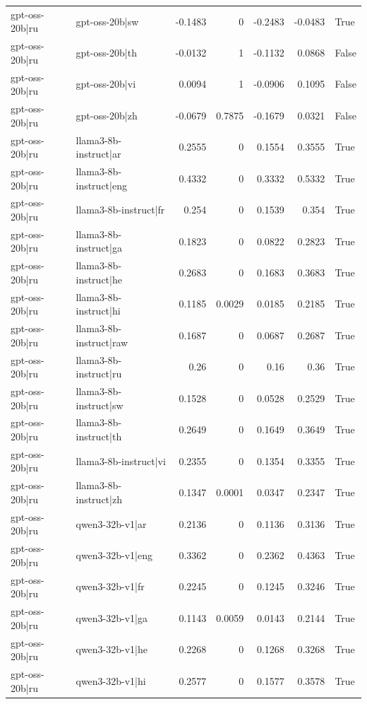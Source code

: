 \begin{table}
\begin{tabular}{l l r r r r l}
gpt-oss-20b|ru & gpt-oss-20b|sw & -0.1483 & 0 & -0.2483 & -0.0483 & True \\
gpt-oss-20b|ru & gpt-oss-20b|th & -0.0132 & 1 & -0.1132 & 0.0868 & False \\
gpt-oss-20b|ru & gpt-oss-20b|vi & 0.0094 & 1 & -0.0906 & 0.1095 & False \\
gpt-oss-20b|ru & gpt-oss-20b|zh & -0.0679 & 0.7875 & -0.1679 & 0.0321 & False \\
gpt-oss-20b|ru & llama3-8b-instruct|ar & 0.2555 & 0 & 0.1554 & 0.3555 & True \\
gpt-oss-20b|ru & llama3-8b-instruct|eng & 0.4332 & 0 & 0.3332 & 0.5332 & True \\
gpt-oss-20b|ru & llama3-8b-instruct|fr & 0.254 & 0 & 0.1539 & 0.354 & True \\
gpt-oss-20b|ru & llama3-8b-instruct|ga & 0.1823 & 0 & 0.0822 & 0.2823 & True \\
gpt-oss-20b|ru & llama3-8b-instruct|he & 0.2683 & 0 & 0.1683 & 0.3683 & True \\
gpt-oss-20b|ru & llama3-8b-instruct|hi & 0.1185 & 0.0029 & 0.0185 & 0.2185 & True \\
gpt-oss-20b|ru & llama3-8b-instruct|raw & 0.1687 & 0 & 0.0687 & 0.2687 & True \\
gpt-oss-20b|ru & llama3-8b-instruct|ru & 0.26 & 0 & 0.16 & 0.36 & True \\
gpt-oss-20b|ru & llama3-8b-instruct|sw & 0.1528 & 0 & 0.0528 & 0.2529 & True \\
gpt-oss-20b|ru & llama3-8b-instruct|th & 0.2649 & 0 & 0.1649 & 0.3649 & True \\
gpt-oss-20b|ru & llama3-8b-instruct|vi & 0.2355 & 0 & 0.1354 & 0.3355 & True \\
gpt-oss-20b|ru & llama3-8b-instruct|zh & 0.1347 & 0.0001 & 0.0347 & 0.2347 & True \\
gpt-oss-20b|ru & qwen3-32b-v1|ar & 0.2136 & 0 & 0.1136 & 0.3136 & True \\
gpt-oss-20b|ru & qwen3-32b-v1|eng & 0.3362 & 0 & 0.2362 & 0.4363 & True \\
gpt-oss-20b|ru & qwen3-32b-v1|fr & 0.2245 & 0 & 0.1245 & 0.3246 & True \\
gpt-oss-20b|ru & qwen3-32b-v1|ga & 0.1143 & 0.0059 & 0.0143 & 0.2144 & True \\
gpt-oss-20b|ru & qwen3-32b-v1|he & 0.2268 & 0 & 0.1268 & 0.3268 & True \\
gpt-oss-20b|ru & qwen3-32b-v1|hi & 0.2577 & 0 & 0.1577 & 0.3578 & True \\

\end{tabular}
\end{table}
